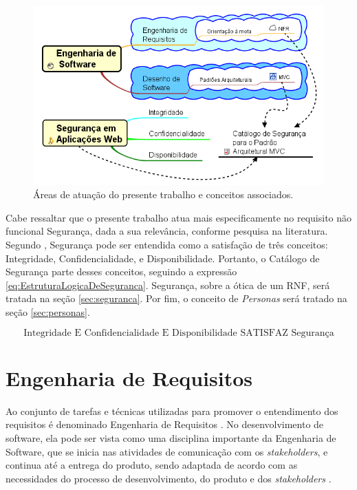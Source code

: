 \pagebreak

\begin{figure}[h!]
	\centering
	\includegraphics[keepaspectratio=true,scale=0.8]{figuras/bigPicture.png}
	\caption{Áreas de atuação do presente trabalho e conceitos associados.}
	\label{BigPicture}
\end{figure}

Cabe ressaltar que o presente trabalho atua mais especificamente no requisito não funcional Segurança, dada a sua relevância, conforme pesquisa na literatura. Segundo \cite{chung2012non}, Segurança pode ser entendida como a satisfação de três conceitos: Integridade, Confidencialidade, e Disponibilidade. Portanto, o Catálogo de Segurança parte desses conceitos, seguindo a expressão \ref{eq:EstruturaLogicaDeSeguranca}. Segurança, sobre a ótica de um RNF, será tratada na seção \ref{sec:seguranca}. Por fim, o conceito de \textit{Personas} será tratado na seção \ref{sec:personas}.

\begin{equation}
	\label{eq:EstruturaLogicaDeSeguranca}
	\textrm{Integridade E Confidencialidade E Disponibilidade SATISFAZ Segurança}
\end{equation}

\section{Engenharia de Requisitos}
\label{sec:requisitos}

Ao conjunto de tarefas e técnicas utilizadas para promover o entendimento dos requisitos é denominado Engenharia de Requisitos \cite{pressman2011engenharia}. No desenvolvimento de software, ela pode ser vista como uma disciplina importante da Engenharia de Software, que se inicia nas atividades de comunicação com os \textit{stakeholders}, e continua até a entrega do produto, sendo adaptada de acordo com as necessidades do processo de desenvolvimento, do produto e dos \textit{stakeholders} \cite{pressman2011engenharia}.

